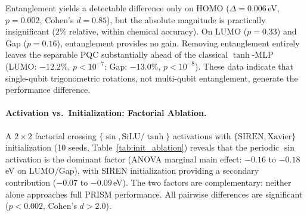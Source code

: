 \documentclass[10pt,twocolumn,letterpaper]{article}
\begin{document}
Entanglement yields a detectable difference only on HOMO ($\Delta = 0.006$\,eV, $p = 0.002$, Cohen's $d = 0.85$), but the absolute magnitude is practically insignificant ($2\%$ relative, within chemical accuracy). On LUMO ($p = 0.33$) and Gap ($p = 0.16$), entanglement provides no gain. Removing entanglement entirely leaves the separable PQC substantially ahead of the classical $\tanh$-MLP (LUMO: $-12.2\%$, $p < 10^{-7}$; Gap: $-13.0\%$, $p < 10^{-8}$). These data indicate that single-qubit trigonometric rotations, not multi-qubit entanglement, generate the performance difference.

\paragraph{Activation vs.\ Initialization: Factorial Ablation.}
\label{sec:init_ablation}
A $2 \times 2$ factorial crossing $\{\sin, \mathrm{SiLU}/\tanh\}$ activations with $\{\text{SIREN}, \text{Xavier}\}$ initialization (10 seeds, Table~\ref{tab:init_ablation}) reveals that the periodic $\sin$ activation is the dominant factor (ANOVA marginal main effect: $-0.16$ to $-0.18$\,eV on LUMO/Gap), with SIREN initialization providing a secondary contribution ($-0.07$ to $-0.09$\,eV). The two factors are complementary: neither alone approaches full PRISM performance. All pairwise differences are significant ($p < 0.002$, Cohen's $d > 2.0$).

\begin{table}[h]
\centering
\small
\caption{\textbf{$2 \times 2$ Factorial Ablation: Activation $\times$ Initialization} ($N = 1{,}000$, 10 seeds). Test MAE (eV), mean $\pm$ std. All four models have exactly $2{,}527$ parameters. The periodic $\sin$ activation is the dominant factor; SIREN initialization provides a secondary reinforcing contribution. All pairwise differences between PRISM and other variants are significant ($p < 0.002$, Cohen's $d > 2.0$).}
\label{tab:init_ablation}
\end{table}
\end{document}
